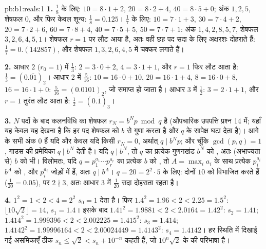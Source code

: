 \begin{solution}{pb:b1:reals:1}
\textbf{1.} $\frac 18$ के लिए: $10 = 8 \cdot 1 + 2$, $20 = 8 \cdot 2 + 4$,
$40 = 8 \cdot 5 + 0$; अंक $1, 2, 5$, शेषफल $0$, और फिर केवल शून्य: $\frac 18
= 0.125$। $\frac 17$ के लिए: $10 = 7 \cdot 1 + 3$, $30 = 7 \cdot 4 + 2$, $20
= 7 \cdot 2 + 6$, $60 = 7 \cdot 8 + 4$, $40 = 7 \cdot 5 + 5$, $50 = 7 \cdot
7 + 1$: अंक $1, 4, 2, 8, 5, 7$, शेषफल $3, 2, 6, 4, 5, 1$। शेषफल $r = 1$ पर
लौट आया है, अतः वही छह पद सदा के लिए अक्षरशः दोहराते हैं: $\frac 17 =
0.(142857)$, और शेषफल $1, 3, 2, 6, 4, 5$ में चक्कर लगाते हैं।

\textbf{2.} आधार $2$ ($r_0 = 1$) में $\frac 13$: $2 = 3 \cdot 0 + 2$, $4 = 3
\cdot 1 + 1$, और $r = 1$ फिर लौट आता है: $\frac 13 = (0.\overline{01})_2$।
आधार $2$ में $\frac{5}{16}$: $10 = 16 \cdot 0 + 10$, $20 = 16 \cdot 1 + 4$,
$8 = 16 \cdot 0 + 8$, $16 = 16 \cdot 1 + 0$: $\frac{5}{16} = (0.0101)_2$, जो
समाप्त हो जाता है। आधार $3$ में $\frac 12$: $3 = 2 \cdot 1 + 1$, और $r = 1$
तुरंत लौट आता है: $\frac 12 = (0.\overline{1})_3$।

\textbf{3.} $N$ पदों के बाद कलनविधि का शेषफल $r_N = b^N p \bmod q$ है
(औपचारिक उपपत्ति प्रश्न 14 में; यहाँ यह केवल यह देखना है कि हर पद शेषफल को
$b$ से गुणा करता है और $q$ के सापेक्ष घटा देता है)। आगे के सभी अंक $0$ हैं
यदि और केवल यदि किसी $r_N = 0$, अर्थात् $q \mid b^N p$; और चूँकि $\gcd(p, q)
= 1$, गाउस की प्रमेयिका $q \mid b^N$ देती है। यदि $q \mid b^N$, तो $q$ का
प्रत्येक  गुणनखंड $b^N$ को , अतः (अभाज्यता से) $b$ को
भी। विलोमतः, यदि $q = p_1^{a_1} \cdots p_r^{a_r}$ का प्रत्येक  $b$ को
, तो $A = \max_i a_i$ के साथ प्रत्येक $p_i^{a_i}$ $b^A$ को
, और $p_i^{a_i}$ जोड़ों में  हैं, अतः $q \mid b^A$।
$q = 20 = 2^2 \cdot 5$ के लिए: दोनों  $10$ को विभाजित करते हैं
($\frac{1}{20} = 0.05$), पर $2 \nmid 3$, अतः आधार $3$ में $\frac{1}{20}$ सदा
दोहराता रहता है।

\textbf{4.} $1^2 = 1 < 2 < 4 = 2^2$ $s_0 = 1$ देता है। फिर $1.4^2 = 1.96 < 2
< 2.25 = 1.5^2$: $\lfloor 10\sqrt 2 \rfloor = 14$, $s_1 = 1.4$। इसके बाद
$1.41^2 = 1.9881 < 2 < 2.0164 = 1.42^2$: $s_2 = 1.41$; $1.414^2 = 1.999396 <
2 < 2.002225 = 1.415^2$: $s_3 = 1.414$; $1.4142^2 = 1.99996164 < 2 <
2.00024449 = 1.4143^2$: $s_4 = 1.4142$। हर स्थिति में दिखाई गई असमिकाएँ ठीक
$s_n \leq \sqrt 2 < s_n + 10^{-n}$ कहती हैं, जो $10^n \sqrt 2$ के  की
परिभाषा है।


\end{solution}

